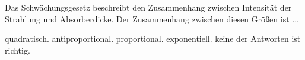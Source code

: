 \documentclass[11pt]{exam}
\begin{document}
\begin{questions}
\vspace{3mm}\question Das Schwächungsgesetz beschreibt den Zusammenhang zwischen Intensität der Strahlung und Absorberdicke. Der Zusammenhang zwischen diesen Größen ist ...

\begin{choices}
	\choice quadratisch.
	\choice antiproportional.
	\choice proportional.
	\choice exponentiell.
	\choice keine der Antworten ist richtig.
\end{choices}

\vspace{3mm}\end{questions}
\end{document}
